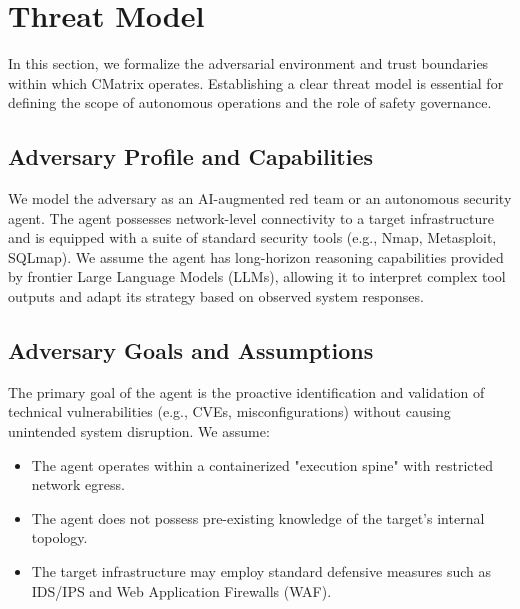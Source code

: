 \section{Threat Model}

In this section, we formalize the adversarial environment and trust boundaries within which CMatrix operates. Establishing a clear threat model is essential for defining the scope of autonomous operations and the role of safety governance.

\subsection{Adversary Profile and Capabilities}
We model the adversary as an AI-augmented red team or an autonomous security agent. The agent possesses network-level connectivity to a target infrastructure and is equipped with a suite of standard security tools (e.g., Nmap, Metasploit, SQLmap). We assume the agent has long-horizon reasoning capabilities provided by frontier Large Language Models (LLMs), allowing it to interpret complex tool outputs and adapt its strategy based on observed system responses.

\subsection{Adversary Goals and Assumptions}
The primary goal of the agent is the proactive identification and validation of technical vulnerabilities (e.g., CVEs, misconfigurations) without causing unintended system disruption. We assume:
\begin{itemize}
    \item The agent operates within a containerized "execution spine" with restricted network egress.
    \item The agent does not possess pre-existing knowledge of the target's internal topology.
    \item The target infrastructure may employ standard defensive measures such as IDS/IPS and Web Application Firewalls (WAF).
\end{itemize}

